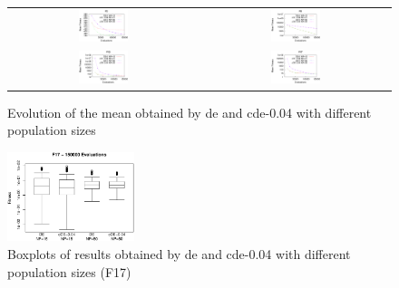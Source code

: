\documentclass[preprint,3p]{elsarticle}
\newcommand{\CDE}{c{\sc de}}
\newcommand{\DE}{{\sc de}}
\begin{document}
\begin{figure}[!t]
\centering
\begin{tabular}{cc}
  \includegraphics[width=0.27\textwidth]{images/Pop15_50/F2.eps} & \includegraphics[width=0.27\textwidth]{images/Pop15_50/F8.eps}  \\
  \includegraphics[width=0.27\textwidth]{images/Pop15_50/F13.eps} & \includegraphics[width=0.27\textwidth]{images/Pop15_50/F17.eps}  \\
\end{tabular}
\caption{Evolution of the mean obtained by \DE{} and \CDE{}-0.04 with different population sizes}
\label{fig:pop}
\end{figure}

\begin{figure}[!t]
\centering
\includegraphics[width=0.33\textwidth]{images/Pop15_50/F17_boxplots.eps}
\caption{Boxplots of results obtained by \DE{} and \CDE{}-0.04 with different population sizes (F17)}
\label{fig:pop_f17_boxplots}
\end{figure}
\end{document}

